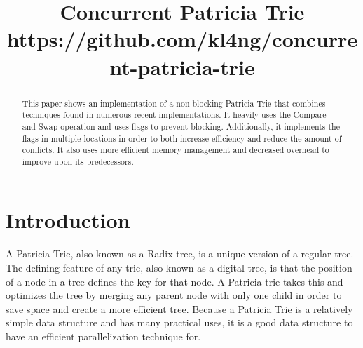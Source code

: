 \documentclass[conference]{IEEEtran}
\begin{document}
\lstset{language=Java, basicstyle=\small, breaklines=true}



\title{Concurrent Patricia Trie \\ \normalsize https://github.com/kl4ng/concurrent-patricia-trie}

\author{
\and
{}
}

\maketitle


\begin{abstract}
This paper shows an implementation of a non-blocking Patricia Trie that combines techniques found in numerous recent implementations. It heavily uses the Compare and Swap operation and uses flags to prevent blocking. Additionally, it implements the flags in multiple locations in order to both increase efficiency and reduce the amount of conflicts. It also uses more efficient memory management and decreased overhead to improve upon its predecessors.
\end{abstract}


\section{Introduction}
A Patricia Trie, also known as a Radix tree, is a unique version of a regular tree. The defining feature of any trie, also known as a digital tree, is that the position of a node in a tree defines the key for that node. A Patricia trie takes this and optimizes the tree by merging any parent node with only one child in order to save space and create a more efficient tree.\cite{Shafiei2013} Because a Patricia Trie is a relatively simple data structure and has many practical uses, it is a good data structure to have an efficient parallelization technique for.
	
\end{document}
